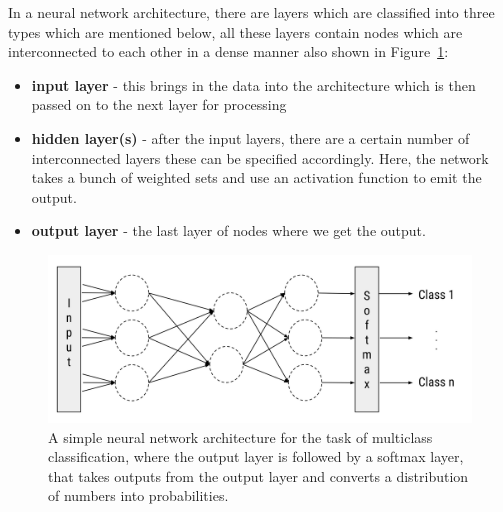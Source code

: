 In a neural network architecture, there are layers which are classified into three types which are mentioned below, all these layers contain nodes which are interconnected to each other in a dense manner also shown in Figure~\ref{fig:nn}:
\begin{itemize}
    \item \textbf{input layer} - this brings in the data into the architecture which is then passed on to the next layer for processing
    \item \textbf{hidden layer(s)} - after the input layers, there are a certain number of interconnected layers these can be specified accordingly. Here, the network takes a bunch of weighted sets and use an activation function to emit the output.
    \item \textbf{output layer} - the last layer of nodes where we get the output.
\end{itemize}
\begin{figure}[!htb]
    \centering
    \includegraphics[scale=0.6]{Figures/neural-network.png}
    \caption{A simple neural network architecture for the task of multiclass classification, where the output layer is followed by a softmax layer, that takes outputs from the output layer and converts a distribution of numbers into probabilities.}
    \label{fig:nn}
\end{figure}

